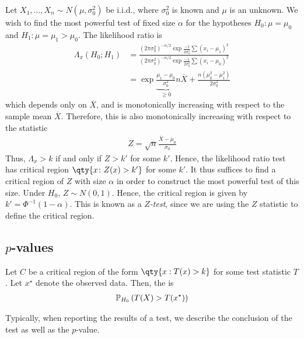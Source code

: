 \begin{example} \label{exm:5.5}
	Let $X_1, \dots, X_n \sim N(\mu, \sigma_0^2)$ be i.i.d., where $\sigma_0^2$ is known and $\mu$ is an unknown.
	We wish to find the most powerful test of fixed size $\alpha$ for the hypotheses $H_0 \colon \mu = \mu_0$ and $H_1 \colon \mu = \mu_1 > \mu_0$.
	The likelihood ratio is
	\begin{align*}
		\Lambda_x(H_0;H_1) & = \frac{(2\pi \sigma_0^2)^{-n/2} \exp{\frac{-1}{2\sigma_0^2} \sum (x_i - \mu_1)^2}}{(2\pi \sigma_0^2)^{-n/2} \exp{\frac{-1}{2\sigma_0^2} \sum (x_i - \mu_0)^2}} \\
		& = \exp{\underbrace{\frac{\mu_1 - \mu_0}{\sigma_0^2}}_{\geq 0} n \overline X + \frac{n(\mu_0^2 - \mu_1^2)}{2\sigma_0^2}}
	\end{align*}
	which depends only on $\overline X$, and is monotonically increasing with respect to the sample mean $\overline X$.
	Therefore, this is also monotonically increasing with respect to the statistic
	\begin{align*}
		Z = \sqrt{n}\frac{\overline X - \mu_0}{\sigma_0}
	\end{align*}
	Thus, $\Lambda_x > k$ if and only if $Z > k'$ for some $k'$.
	Hence, the likelihood ratio test has critical region $\qty{x\colon Z(x) > k'}$ for some $k'$.
	It thus suffices to find a critical region of $Z$ with size $\alpha$ in order to construct the most powerful test of this size.
	Under $H_0$, $Z \sim N(0,1)$.
	Hence, the critical region is given by $k' = \Phi^{-1}(1-\alpha)$.
	This is known as a \textit{$Z$-test}, since we are using the $Z$ statistic to define the critical region.
\end{example}

\subsection{\texorpdfstring{$p$}{p}-values}

\begin{definition}
	Let $C$ be a critical region of the form $\qty{ x: T(x) > k }$ for some test statistic $T$.
	Let $x^\star$ denote the observed data.
	Then, the  is
	\begin{align*}
		\mathbb{P}_{H_0}\left({T(X) > T(x^\star)}\right)
	\end{align*}
\end{definition}

Typically, when reporting the results of a test, we describe the conclusion of the test as well as the $p$-value.

